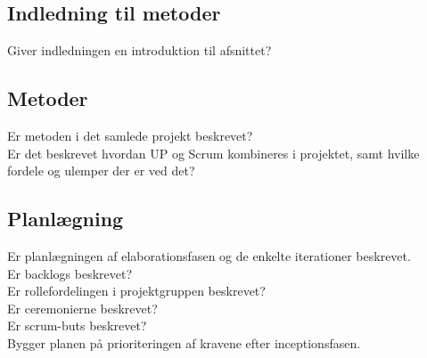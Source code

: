 \subsection{Indledning til metoder}
Giver indledningen en introduktion til  afsnittet?\\
\subsection{Metoder}
Er metoden i det samlede projekt beskrevet?\\
Er det beskrevet hvordan UP og Scrum kombineres i projektet, samt hvilke fordele og ulemper der er ved det?\\
\subsection{Planlægning}
Er planlægningen af elaborationsfasen og de enkelte iterationer beskrevet.\\
Er backlogs beskrevet?\\
Er rollefordelingen i projektgruppen beskrevet?\\
Er ceremonierne beskrevet?\\
Er scrum-buts beskrevet?\\
Bygger planen på prioriteringen af kravene efter inceptionsfasen.\\
